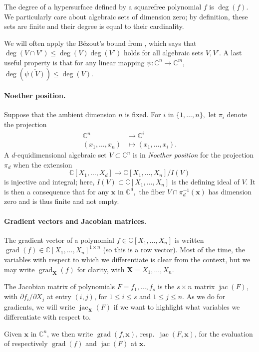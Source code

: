 \documentclass[12pt]{article}
\def\xb{{\bm x}}
\DeclareMathOperator{\jac}{jac}
\DeclareMathOperator{\grad}{grad}
\def\C{\mathbb{C}}
\begin{document}
The degree of a hypersurface defined by a squarefree polynomial $f$ is
$\deg(f)$. We particularly care about algebraic sets of dimension zero; by
definition, these sets are finite and their degree is equal to their
cardinality.

We will often apply the B\'ezout’s bound from \cite[Theorem 1]{H},
which says that $\deg(V \cap V') \le \deg(V) \deg(V')$ holds for all
algebraic sets $V,V'$. A last useful property is that for any linear
mapping $\psi: \C^n \to \C^m$, $\deg(\overline{ \psi(V)}) \le \deg(V)$.

\paragraph*{Noether position.}
Suppose that the ambient dimension $n$ is fixed.  For $i$ in
$\{1,\dots,n\},$ let $\pi_i$ denote the projection
\begin{align*}
\C^n  &\rightarrow \C^i \\
(x_1,\hdots,x_n) &\mapsto  (x_1,\hdots,x_i).    
\end{align*} 
A $d$-equidimensional algebraic set $V \subset \C^n$ is in
\textit{Noether position} for the projection $\pi_d$ when the
extension \[\C[X_1,\hdots,X_{d}] \rightarrow \C[X_1,\hdots,X_n]/I(V)\]
is injective and integral; here, $I(V) \subset \C[X_1,\hdots,X_n]$ is
the defining ideal of $V$. It is then a consequence that for any $\xb$ in
$\C^d,$ the fiber $V \cap \pi_d^{-1}(\xb)$ has dimension zero and is
thus finite and not empty.

\paragraph*{Gradient vectors and Jacobian matrices.} The gradient vector 
of a polynomial $f \in \C[X_1,\dots,X_n]$ is written $\grad(f) \in
\C[X_1,\dots,X_n]^{1 \times n}$ (so this is a row vector). Most of the
time, the variables with respect to which we differentiate is clear
from the context, but we may write $\grad_{\bm X}(f)$ for clarity,
with $\bm X=X_1,\dots,X_n$.

The Jacobian matrix of polynomials $F=f_1,\dots,f_s$ is the $s \times
n$ matrix $\jac(F)$, with $\partial f_i/\partial X_j$ at entry
$(i,j)$, for $1\le i \le s$ and $1 \le j \le n$. As we do for
gradients, we will write $\jac_{\bm X}(F)$ if we want to highlight
what variables we differentiate with respect to.

Given $\xb$ in $\C^n$, we then write $\grad(f,\xb)$, resp.\ $\jac(F,
\xb)$, for the evaluation of respectively $\grad(f)$ and $\jac(F)$ 
at $\xb$.
\end{document}
